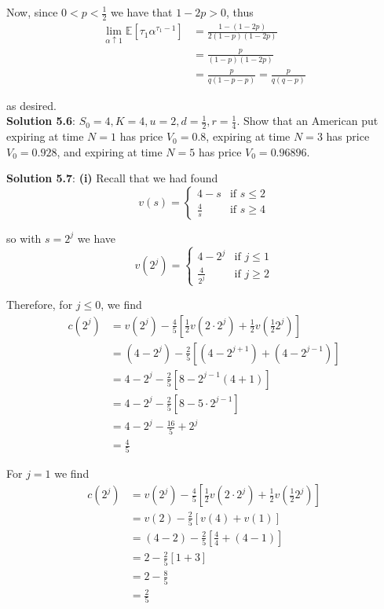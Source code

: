 \documentclass[12pt]{article}
\newcommand{\E}{\mathbb E}
\begin{document}
Now, since $0 < p < \frac{1}{2}$ we have that $1 - 2p > 0$, thus
\begin{align*}
	\lim_{\alpha \uparrow 1} \E \left[ \tau_1 \alpha^{\tau_1 - 1} \right] &= \frac{1 - (1 - 2p) }{ 2(1 - p)(1 - 2p) } \\
	&= \frac{p}{(1 - p)(1 - 2p)} \\
	&= \frac{p}{q(1 - p - p)} = \frac{p}{q(q - p)}
\end{align*}

as desired. \\

\newpage
{\bf Solution 5.6}: $S_0 = 4, K = 4, u = 2, d = \frac{1}{2}, r = \frac{1}{4}$. Show that an American put expiring at time $N = 1$ has price $V_0 = 0.8$, expiring at time $N = 3$ has price $V_0 = 0.928$, and expiring at time $N = 5$ has price $V_0 = 0.96896$.

\newpage
{\bf Solution 5.7}: 
{\bf (i)} Recall that we had found 
\begin{equation*}
	v(s) = 
	\begin{cases}
		4 - s & \text{if } s \leq 2 \\
		\frac{4}{s} & \text{if } s \geq 4
	\end{cases}
\end{equation*}

so with $s = 2^j$ we have
\begin{equation*}
	v(2^j) = 
	\begin{cases}
		4 - 2^j & \text{if } j \leq 1 \\
		\frac{4}{2^j} & \text{if } j \geq 2
	\end{cases}
\end{equation*}

Therefore, for $j \leq 0$, we find
\begin{align*}
	c(2^j) &= v(2^j) - \frac{4}{5} \left[\frac{1}{2} v(2\cdot 2^j) + \frac{1}{2} v(\frac{1}{2} 2^j) \right] \\
	&= (4 - 2^j) - \frac{2}{5} \left[ (4 - 2^{j + 1}) + (4 - 2^{j - 1}) \right] \\
	&= 4 - 2^j - \frac{2}{5}\left[ 8 - 2^{j - 1}(4 + 1)\right] \\
	&= 4 - 2^j - \frac{2}{5}\left[ 8 - 5\cdot2^{j - 1}\right] \\
	&= 4 - 2^j - \frac{16}{5} + 2^j \\
	&= \frac{4}{5}
\end{align*}

For $j = 1$ we find
\begin{align*}
	c(2^j) &= v(2^j) - \frac{4}{5} \left[\frac{1}{2} v(2\cdot 2^j) + \frac{1}{2} v(\frac{1}{2} 2^j) \right] \\
	&= v(2) - \frac{2}{5} \left[ v(4) + v(1) \right] \\
	&= (4 - 2) - \frac{2}{5} \left[ \frac{4}{4} + (4 - 1) \right] \\
	&= 2 - \frac{2}{5}\left[ 1 + 3 \right] \\
	&= 2 - \frac{8}{5} \\
	&= \frac{2}{5}
\end{align*}
\end{document}
